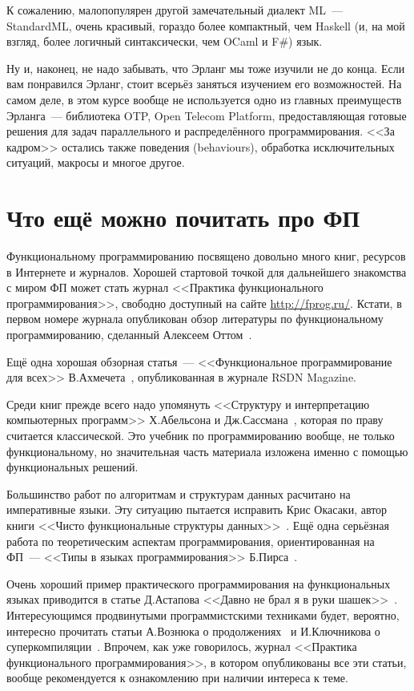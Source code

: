 \documentclass[
  paper=a4,
  fontsize=14pt,
  openany,
  appendixprefix=true
]{scrbook}
\begin{document}
К сожалению, малопопулярен другой замечательный диалект ML~--- StandardML, очень красивый, гораздо более компактный, чем Haskell (и, на мой взгляд, более логичный синтаксически, чем OCaml и F\#) язык.

Ну и, наконец, не надо забывать, что Эрланг мы тоже изучили не до конца. Если вам понравился Эрланг, стоит всерьёз заняться изучением его возможностей. На самом деле, в этом курсе вообще не используется одно из главных преимуществ Эрланга~--- библиотека OTP, Open Telecom Platform, предоставляющая готовые решения для задач параллельного и распределённого программирования. <<За кадром>> остались также поведения (behaviours), обработка исключительных ситуаций, макросы и многое другое.

\section{Что ещё можно почитать про ФП}

Функциональному программированию посвящено довольно много книг, ресурсов в Интернете и журналов. Хорошей стартовой точкой для дальнейшего знакомства с миром ФП может стать журнал <<Практика функционального программирования>>, свободно доступный на сайте \url{http://fprog.ru/}. Кстати, в первом номере журнала опубликован обзор литературы по функциональному программированию, сделанный Алексеем Оттом~\cite{PFP_Ott}.

Ещё одна хорошая обзорная статья~--- <<Функциональное программирование для всех>> В.Ахмечета~\cite{Akhmechet}, опубликованная в журнале RSDN Magazine.

Среди книг прежде всего надо упомянуть <<Структуру и интерпретацию компьютерных программ>> Х.Абельсона и Дж.Сассмана~\cite{SICP}, которая по праву считается классической. Это учебник по программированию вообще, не только функциональному, но значительная часть материала изложена именно с помощью функциональных решений.

Большинство работ по алгоритмам и структурам данных расчитано на императивные языки. Эту ситуацию пытается исправить Крис Окасаки, автор книги <<Чисто функциональные структуры данных>>~\cite{Okasaki}. Ещё одна серьёзная работа по теоретическим аспектам программирования, ориентированная на ФП~--- <<Типы в языках программирования>> Б.Пирса~\cite{Pierce}.

Очень хороший пример практического программирования на функциональных языках приводится в статье Д.Астапова <<Давно не брал я в руки шашек>>~\cite{PFP_Astapov}. Интересующимся продвинутыми программистскими техниками будет, вероятно, интересно прочитать статьи А.Вознюка о продолжениях~\cite{PFP_Voznyuk} и И.Ключникова о суперкомпиляции~\cite{PFP_Klyuchnikov}. Впрочем, как уже говорилось, журнал <<Практика функционального программирования>>, в котором опубликованы все эти статьи, вообще рекомендуется к ознакомлению при наличии интереса к теме.
\end{document}
